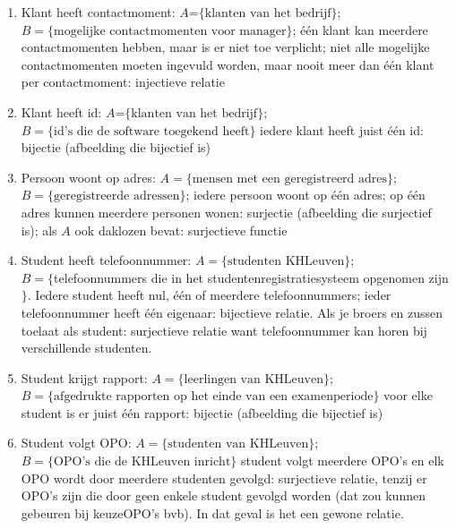 \begin{Oplossing}{2.5}
\begin{enumerate}

\item Klant heeft contactmoment: $A$=$\{\text{klanten van het bedrijf}\}$; \\
$B=\{\text{mogelijke contactmomenten voor manager}\}$;
één klant kan meerdere contactmomenten hebben, maar is er niet toe verplicht;
niet alle mogelijke contactmomenten moeten ingevuld worden, maar nooit meer dan één klant per contactmoment: injectieve relatie

\item Klant heeft id: $A$=$\{\text{klanten van het bedrijf}\}$; \\
$B=\{\text{id's die de software toegekend heeft}\}$
iedere klant heeft juist één id: bijectie (afbeelding die bijectief is)

\item Persoon woont op adres: $A=\{\text{mensen met een geregistreerd adres}\}$; \\
$B=\{\text{geregistreerde adressen}\}$; iedere persoon woont op één adres; op één adres kunnen meerdere personen wonen: surjectie (afbeelding die surjectief is); als $A$ ook daklozen bevat: surjectieve functie

\item Student heeft telefoonnummer: $A=\{\text{studenten KHLeuven}\}$; \\
$B=\{$telefoonnummers die in het studentenregistratiesysteem opgenomen zijn$\}$.  Iedere student heeft nul, één of meerdere telefoonnummers; ieder telefoonnummer heeft één eigenaar: bijectieve relatie.
Als je broers en zussen toelaat als student: surjectieve relatie want telefoonnummer kan horen bij verschillende studenten.

\item Student krijgt rapport: $A=\{\text{leerlingen van KHLeuven}\}$; \\
$B=\{\text{afgedrukte rapporten op het einde van een examenperiode}\}$ voor elke student is er juist één rapport: bijectie (afbeelding die bijectief is)

\item Student volgt OPO: $A=\{\text{studenten van KHLeuven}\}$; \\
$B=\{\text{OPO's die de KHLeuven inricht}\}$ student volgt meerdere OPO's en elk OPO wordt door meerdere studenten gevolgd: surjectieve relatie, tenzij er OPO's zijn die door geen enkele student gevolgd worden (dat zou kunnen gebeuren bij keuzeOPO's bvb). In dat geval is het een gewone relatie.
\end{enumerate}

\end{Oplossing}
